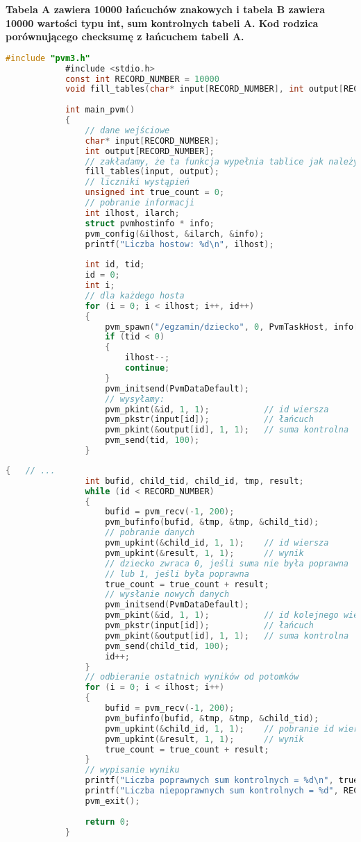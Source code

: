 		\textbf{Tabela A zawiera 10000 łańcuchów znakowych i tabela B zawiera 10000 wartości typu int, sum kontrolnych tabeli A. Kod rodzica porównującego checksumę z łańcuchem tabeli A.}
			\begin{lstlisting}[language=C]
			#include "pvm3.h"
			#include <stdio.h>
			const int RECORD_NUMBER = 10000
			void fill_tables(char* input[RECORD_NUMBER], int output[RECORD_NUMBER]);
			
			int main_pvm()
			{
				// dane wejściowe
				char* input[RECORD_NUMBER];
				int output[RECORD_NUMBER];
				// zakładamy, że ta funkcja wypełnia tablice jak należy
				fill_tables(input, output);
				// liczniki wystąpień
				unsigned int true_count = 0;
				// pobranie informacji
				int ilhost, ilarch;
				struct pvmhostinfo * info;
				pvm_config(&ilhost, &ilarch, &info);
				printf("Liczba hostow: %d\n", ilhost);
				
				int id, tid;
				id = 0;
				int i;
				// dla każdego hosta
				for (i = 0; i < ilhost; i++, id++)
				{
					pvm_spawn("/egzamin/dziecko", 0, PvmTaskHost, info[i].hi_name, 1, &tid);
					if (tid < 0)
					{
						ilhost--;
						continue;
					}
					pvm_initsend(PvmDataDefault);
					// wysyłamy:
					pvm_pkint(&id, 1, 1);			// id wiersza
					pvm_pkstr(input[id]);			// łańcuch
					pvm_pkint(&output[id], 1, 1);	// suma kontrolna
					pvm_send(tid, 100);
				}
			\end{lstlisting}
			\begin{lstlisting}[language=C]
			{	// ...
				int bufid, child_tid, child_id, tmp, result;
				while (id < RECORD_NUMBER)
				{
					bufid = pvm_recv(-1, 200);
					pvm_bufinfo(bufid, &tmp, &tmp, &child_tid);
					// pobranie danych
					pvm_upkint(&child_id, 1, 1);	// id wiersza
					pvm_upkint(&result, 1, 1);		// wynik
					// dziecko zwraca 0, jeśli suma nie była poprawna
					// lub 1, jeśli była poprawna
					true_count = true_count + result;
					// wysłanie nowych danych
					pvm_initsend(PvmDataDefault);
					pvm_pkint(&id, 1, 1);			// id kolejnego wiersza
					pvm_pkstr(input[id]);			// łańcuch
					pvm_pkint(&output[id], 1, 1);	// suma kontrolna
					pvm_send(child_tid, 100);
					id++;
				}
				// odbieranie ostatnich wyników od potomków
				for (i = 0; i < ilhost; i++)
				{
					bufid = pvm_recv(-1, 200);
					pvm_bufinfo(bufid, &tmp, &tmp, &child_tid);
					pvm_upkint(&child_id, 1, 1);	// pobranie id wiersza
					pvm_upkint(&result, 1, 1);		// wynik
					true_count = true_count + result;
				}
				// wypisanie wyniku
				printf("Liczba poprawnych sum kontrolnych = %d\n", true_count);
				printf("Liczba niepoprawnych sum kontrolnych = %d", RECORD_NUMBER - true_count);
				pvm_exit();
				
				return 0;
			}
			\end{lstlisting}
